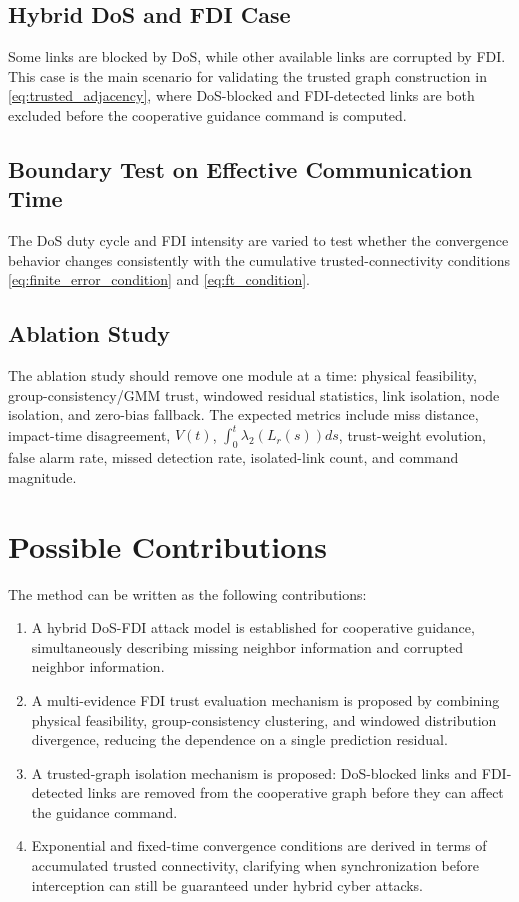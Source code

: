 \documentclass[lettersize,journal]{IEEEtran}
\begin{document}
\subsection{Hybrid DoS and FDI Case}
Some links are blocked by DoS, while other available links are corrupted by FDI. This case is the main scenario for validating the trusted graph construction in \eqref{eq:trusted_adjacency}, where DoS-blocked and FDI-detected links are both excluded before the cooperative guidance command is computed.

\subsection{Boundary Test on Effective Communication Time}
The DoS duty cycle and FDI intensity are varied to test whether the convergence behavior changes consistently with the cumulative trusted-connectivity conditions \eqref{eq:finite_error_condition} and \eqref{eq:ft_condition}.

\subsection{Ablation Study}
The ablation study should remove one module at a time: physical feasibility, group-consistency/GMM trust, windowed residual statistics, link isolation, node isolation, and zero-bias fallback. The expected metrics include miss distance, impact-time disagreement, $V(t)$, $\int_0^t\lambda_2(L_r(s))ds$, trust-weight evolution, false alarm rate, missed detection rate, isolated-link count, and command magnitude.

\section{Possible Contributions}

The method can be written as the following contributions:
\begin{enumerate}
    \item A hybrid DoS-FDI attack model is established for cooperative guidance, simultaneously describing missing neighbor information and corrupted neighbor information.
    \item A multi-evidence FDI trust evaluation mechanism is proposed by combining physical feasibility, group-consistency clustering, and windowed distribution divergence, reducing the dependence on a single prediction residual.
    \item A trusted-graph isolation mechanism is proposed: DoS-blocked links and FDI-detected links are removed from the cooperative graph before they can affect the guidance command.
    \item Exponential and fixed-time convergence conditions are derived in terms of accumulated trusted connectivity, clarifying when synchronization before interception can still be guaranteed under hybrid cyber attacks.
\end{enumerate}
\end{document}
